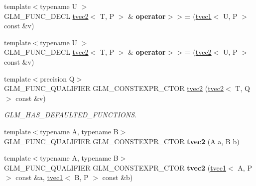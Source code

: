 \begin{DoxyCompactItemize}
{\footnotesize template$<$typename U $>$ }\\G\+L\+M\+\_\+\+F\+U\+N\+C\+\_\+\+D\+E\+CL \hyperlink{structglm_1_1tvec2}{tvec2}$<$ T, P $>$ \& {\bfseries operator$>$$>$=} (\hyperlink{structglm_1_1tvec1}{tvec1}$<$ U, P $>$ const \&v)
\item 
\mbox{\label{structglm_1_1tvec2_aea51b73efe332b3fae252644ea44dc43}} 
{\footnotesize template$<$typename U $>$ }\\G\+L\+M\+\_\+\+F\+U\+N\+C\+\_\+\+D\+E\+CL \hyperlink{structglm_1_1tvec2}{tvec2}$<$ T, P $>$ \& {\bfseries operator$>$$>$=} (\hyperlink{structglm_1_1tvec2}{tvec2}$<$ U, P $>$ const \&v)
\item 
\mbox{\label{structglm_1_1tvec2_a47853ad220033f45cf430dc6b997ad93}} 
{\footnotesize template$<$precision Q$>$ }\\G\+L\+M\+\_\+\+F\+U\+N\+C\+\_\+\+Q\+U\+A\+L\+I\+F\+I\+ER G\+L\+M\+\_\+\+C\+O\+N\+S\+T\+E\+X\+P\+R\+\_\+\+C\+T\+OR \hyperlink{structglm_1_1tvec2_a47853ad220033f45cf430dc6b997ad93}{tvec2} (\hyperlink{structglm_1_1tvec2}{tvec2}$<$ T, Q $>$ const \&v)
\begin{DoxyCompactList}\small\item\em G\+L\+M\+\_\+\+H\+A\+S\+\_\+\+D\+E\+F\+A\+U\+L\+T\+E\+D\+\_\+\+F\+U\+N\+C\+T\+I\+O\+NS. \end{DoxyCompactList}\item 
\mbox{\label{structglm_1_1tvec2_a167151d2df6c270325b9dc98d0dbc0ba}} 
{\footnotesize template$<$typename A, typename B$>$ }\\G\+L\+M\+\_\+\+F\+U\+N\+C\+\_\+\+Q\+U\+A\+L\+I\+F\+I\+ER G\+L\+M\+\_\+\+C\+O\+N\+S\+T\+E\+X\+P\+R\+\_\+\+C\+T\+OR {\bfseries tvec2} (A a, B b)
\item 
\mbox{\label{structglm_1_1tvec2_aed8786f52c21247f99eaa2f608ac092c}} 
{\footnotesize template$<$typename A, typename B$>$ }\\G\+L\+M\+\_\+\+F\+U\+N\+C\+\_\+\+Q\+U\+A\+L\+I\+F\+I\+ER G\+L\+M\+\_\+\+C\+O\+N\+S\+T\+E\+X\+P\+R\+\_\+\+C\+T\+OR {\bfseries tvec2} (\hyperlink{structglm_1_1tvec1}{tvec1}$<$ A, P $>$ const \&a, \hyperlink{structglm_1_1tvec1}{tvec1}$<$ B, P $>$ const \&b)
\item 
\mbox{\label{structglm_1_1tvec2_aa86f005e11de8a9134370f9d92fb096c}} 

\end{DoxyCompactItemize}
